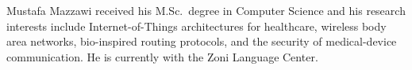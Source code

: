 \documentclass[journal,twoside,web]{IEEEtran}
\begin{document}




\begin{IEEEbiographynophoto}{Mustafa Mazzawi}
received his M.Sc.\ degree in Computer Science and his research
interests include Internet-of-Things architectures for healthcare,
wireless body area networks, bio-inspired routing protocols, and the
security of medical-device communication.  He is currently with the
Zoni Language Center.
\end{IEEEbiographynophoto}
\end{document}
